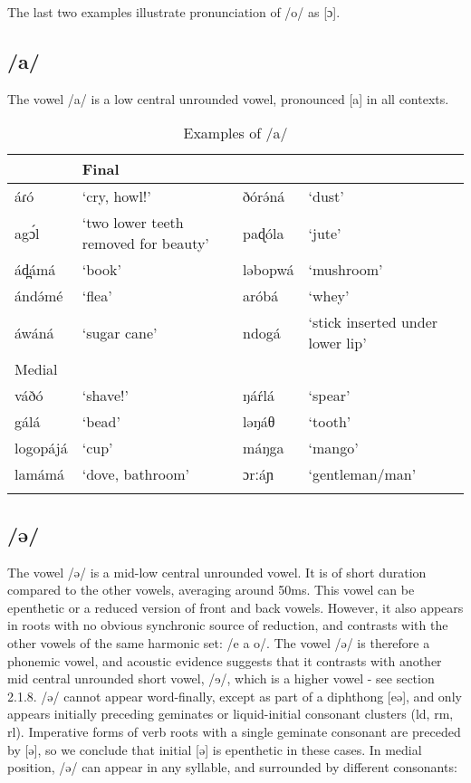 The last two examples illustrate pronunciation of /o/ as [ɔ].

\subsection{/a/}

The vowel /a/ is a low central unrounded vowel, pronounced [a] in all contexts. 

\begin{table} 
\caption{Examples of /a/}	
 \label{tab:ch2:8}
\begin{tabular}[t]{lp{3.5cm}lp{3.5cm}}
\lsptoprule
\multicolumn{2}{l}{Initial} &	\multicolumn{2}{l}{Final}  \\
\midrule
áɾó	&	‘cry, howl!’						&	ðórə́ná		&	‘dust’\\
agɔ́l		&	‘two lower teeth removed for beauty’	&	paɖóla		&	‘jute’\\
ád̪ámá	&	‘book’							&	ləbopwá		&	‘mushroom’\\
ándə́mé	&	‘flea’							&	aróbá		&	‘whey’\\
áwáná	&	‘sugar cane’						&	ndogá		&	‘stick inserted under lower lip’\\
\midrule
 \multicolumn{2}{l}{Medial} & & \\
 \midrule 			
váðó	&	‘shave!’			&	ŋáŕlá	&	‘spear’\\
gálá	&	‘bead’			&	ləŋáθ	&	‘tooth’\\
logopájá	&	‘cup’			&	máŋga	&	‘mango’\\
lamámá	&	‘dove, bathroom’	&	ɔrːáɲ	&	‘gentleman/man’\\
\lspbottomrule	
\end{tabular}
\end{table}


\subsection{/ə/}

The vowel /ə/ is a mid-low central unrounded vowel. It is of short duration compared to the other vowels, averaging around 50ms. This vowel can be epenthetic or a reduced version of front and back vowels. However, it also appears in roots with no obvious synchronic source of reduction, and contrasts with the other vowels of the same harmonic set: /e a o/. The vowel /ə/ is therefore a phonemic vowel, and acoustic evidence suggests that it contrasts with another mid central unrounded short vowel, /ɘ/, which is a higher vowel - see section 2.1.8. /ə/ cannot appear word-finally, except as part of a diphthong [eə], and only appears initially preceding geminates or liquid-initial consonant clusters (ld, rm, rl). Imperative forms of verb roots with a single geminate consonant are preceded by [ə], so we conclude that initial [ə] is epenthetic in these cases. In medial position, /ə/ can appear in any syllable, and surrounded by different consonants:

